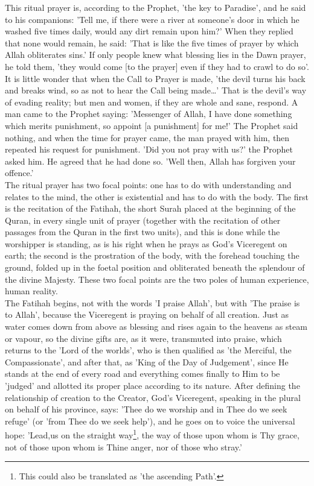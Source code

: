 \documentclass[11pt, b5paper, twoside]{book}
\begin{document}
This ritual prayer is, according to the Prophet, 'the key to Paradise', and he said to his 
companions: 'Tell me, if there were a river at someone's door in which he washed five times daily, 
would any dirt remain upon him?' When they replied that none would remain, he said: 'That is like the 
five times of prayer by which Allah obliterates sins.' If only people knew what blessing lies in the 
Dawn prayer, he told them, 'they would come [to the prayer] even if they had to crawl to do so'. It 
is little wonder that when the Call to Prayer is made, 'the devil turns his back and breaks wind, so 
as not to hear the Call being made\ldots' That is the devil's way of evading reality; but men and 
women, if they are whole and sane, respond. A man came to the Prophet saying: 'Messenger of Allah, I 
have done something which merits punishment, so appoint [a punishment] for me!' The Prophet said 
nothing, and when the time for prayer came, the man prayed with him, then repeated his request for 
punishment. 'Did you not pray with us?' the Prophet asked him. He agreed that he had done so. 'Well 
then, Allah has forgiven your offence.' \\

The ritual prayer has two focal points: one has to do with understanding and relates to the mind, the 
other is existential and has to do with the body. The first is the recitation of the Fatihah, the 
short Surah placed at the beginning of the Quran, in every single unit of prayer (together with the 
recitation of other passages from the Quran in the first two units), and this is done while the 
worshipper is standing, as is his right when he prays as God's Viceregent on earth; the second is the 
prostration of the body, with the forehead touching the ground, folded up in the foetal position and 
obliterated beneath the splendour of the divine Majesty. These two focal points are the two poles of 
human experience, human reality. \\

The Fatihah begins, not with the words 'I praise Allah', but with 'The praise is to Allah', because 
the Viceregent is praying on behalf of all creation. Just as water comes down from above as blessing 
and rises again to the heavens as steam or vapour, so the divine gifts are, as it were, transmuted 
into praise, which returns to the 'Lord of the worlds', who is then qualified as 'the Merciful, the 
Compassionate', and after that, as 'King of the Day of Judgement', since He stands at the end of 
every road and everything comes finally to Him to be 'judged' and allotted its proper place according 
to its nature. After defining the relationship of creation to the Creator, God's Viceregent, speaking 
in the plural on behalf of his province, says: 'Thee do we worship and in Thee do we seek refuge' (or 
'from Thee do we seek help'), and he goes on to voice the universal hope: 'Lead,us on the straight 
way\footnote{This could also be translated as 'the ascending Path'.}, the way of those upon whom is Thy grace, not of those upon whom is Thine anger, nor of those 
who stray.' \\
\end{document}
